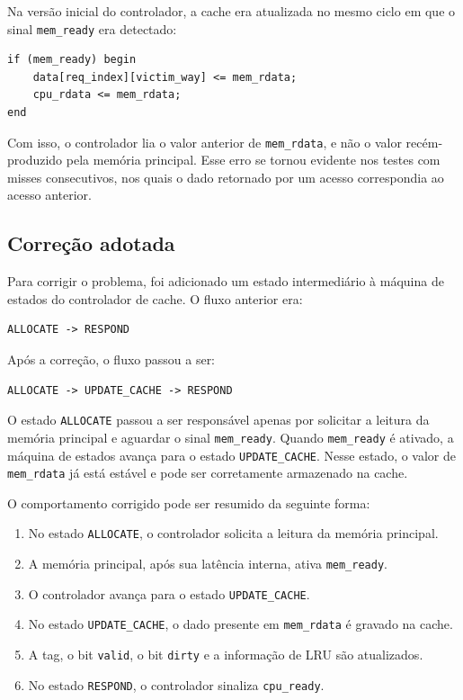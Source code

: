 ﻿\documentclass[12pt,a4paper]{article}
\begin{document}
Na versão inicial do controlador, a cache era atualizada no mesmo ciclo em que o sinal \texttt{mem\_ready} era detectado:

\begin{verbatim}
if (mem_ready) begin
    data[req_index][victim_way] <= mem_rdata;
    cpu_rdata <= mem_rdata;
end
\end{verbatim}

Com isso, o controlador lia o valor anterior de \texttt{mem\_rdata}, e não o valor recém-produzido pela memória principal. Esse erro se tornou evidente nos testes com misses consecutivos, nos quais o dado retornado por um acesso correspondia ao acesso anterior.

\subsection{Correção adotada}

Para corrigir o problema, foi adicionado um estado intermediário à máquina de estados do controlador de cache. O fluxo anterior era:

\begin{verbatim}
ALLOCATE -> RESPOND
\end{verbatim}

Após a correção, o fluxo passou a ser:

\begin{verbatim}
ALLOCATE -> UPDATE_CACHE -> RESPOND
\end{verbatim}

O estado \texttt{ALLOCATE} passou a ser responsável apenas por solicitar a leitura da memória principal e aguardar o sinal \texttt{mem\_ready}. Quando \texttt{mem\_ready} é ativado, a máquina de estados avança para o estado \texttt{UPDATE\_CACHE}. Nesse estado, o valor de \texttt{mem\_rdata} já está estável e pode ser corretamente armazenado na cache.

O comportamento corrigido pode ser resumido da seguinte forma:

\begin{enumerate}
    \item No estado \texttt{ALLOCATE}, o controlador solicita a leitura da memória principal.
    \item A memória principal, após sua latência interna, ativa \texttt{mem\_ready}.
    \item O controlador avança para o estado \texttt{UPDATE\_CACHE}.
    \item No estado \texttt{UPDATE\_CACHE}, o dado presente em \texttt{mem\_rdata} é gravado na cache.
    \item A tag, o bit \texttt{valid}, o bit \texttt{dirty} e a informação de LRU são atualizados.
    \item No estado \texttt{RESPOND}, o controlador sinaliza \texttt{cpu\_ready}.
\end{enumerate}
\end{document}
